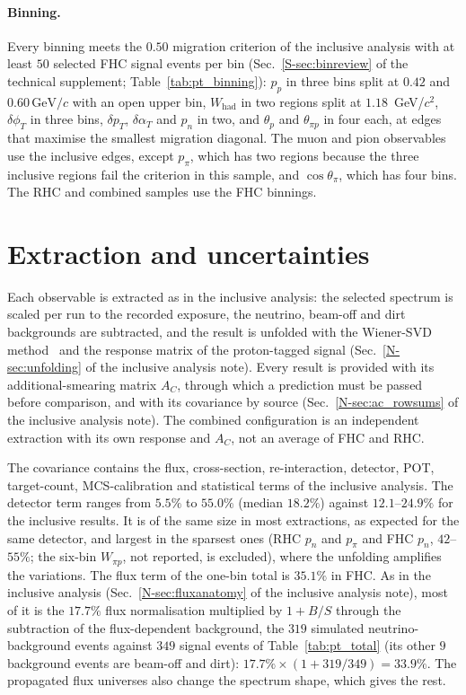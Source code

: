 \documentclass[11pt,a4paper]{article}
\newcommand{\GeVc}{\,\text{GeV}\!/c}
\newcommand{\suppref}[2]{#1~\ref{S-#2} of the technical supplement}
\newcommand{\noteref}[2]{#1~\ref{N-#2} of the inclusive analysis note}
\begin{document}
\paragraph{Binning.} Every binning meets the $0.50$ migration criterion of the inclusive analysis
with at least $50$ selected FHC signal events per bin (\suppref{Sec.}{sec:binreview};
Table~\ref{tab:pt_binning}): $p_p$ in three bins split at $0.42$ and $0.60\GeVc$ with an open upper
bin, $W_\mathrm{had}$ in two regions split at $1.18$~GeV/$c^2$, $\delta\phi_T$ in three bins,
$\delta p_T$, $\delta\alpha_T$ and $p_n$ in two, and $\theta_p$ and $\theta_{\pi p}$ in four each,
at edges that maximise the smallest migration diagonal. The muon and pion observables use the
inclusive edges, except $p_\pi$, which has two regions because the three inclusive regions fail the
criterion in this sample, and $\cos\theta_\pi$, which has four bins. The RHC and combined samples use
the FHC binnings.



\section{Extraction and uncertainties}
\label{sec:pt_extraction}

Each observable is extracted as in the inclusive analysis: the selected spectrum is scaled per run
to the recorded exposure, the neutrino, beam-off and dirt backgrounds are subtracted, and the result
is unfolded with the Wiener-SVD method~\cite{wienervsd} and the response matrix of the proton-tagged signal
(\noteref{Sec.}{sec:unfolding}). Every result is provided with its additional-smearing matrix $A_C$,
through which a prediction must be passed before comparison, and with its covariance by source
(\noteref{Sec.}{sec:ac_rowsums}). The combined configuration is an independent extraction with its
own response and $A_C$, not an average of FHC and RHC.

The covariance contains the flux, cross-section, re-interaction, detector, POT, target-count,
MCS-calibration and statistical terms of the inclusive analysis. The detector term ranges from $5.5\%$ to $55.0\%$
(median $18.2\%$) against $12.1$--$24.9\%$ for the inclusive results. It is of the same size in most
extractions, as expected for the same detector, and largest in the sparsest ones (RHC $p_n$ and $p_\pi$ and
FHC $p_n$, $42$--$55\%$; the six-bin $W_{\pi p}$, not reported, is excluded), where the unfolding
amplifies the variations. The flux term
of the one-bin total is $35.1\%$ in FHC. As in the inclusive analysis (\noteref{Sec.}{sec:fluxanatomy}),
most of it is the $17.7\%$ flux normalisation multiplied by $1+B/S$ through the subtraction of the
flux-dependent background, the $319$ simulated neutrino-background events against $349$ signal events of
Table~\ref{tab:pt_total} (its other $9$ background events are beam-off and dirt): $17.7\%\times(1+319/349)
=33.9\%$. The propagated flux universes also change the spectrum shape, which gives the rest.
\end{document}
